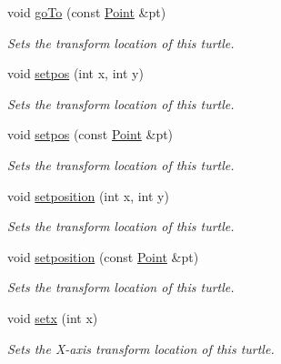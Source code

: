 \begin{DoxyCompactItemize}
\mbox{\label{classcturtle_1_1Turtle_aebaca8328fa32d5fb286ad99a57b62fc}} 
void \hyperlink{classcturtle_1_1Turtle_aebaca8328fa32d5fb286ad99a57b62fc}{go\+To} (const \hyperlink{structcturtle_1_1ivec2}{Point} \&pt)
\begin{DoxyCompactList}\small\item\em Sets the transform location of this turtle. \end{DoxyCompactList}\item 
void \hyperlink{classcturtle_1_1Turtle_ab7e2193a04b72e94069fcccd85fa40db}{setpos} (int x, int y)
\begin{DoxyCompactList}\small\item\em Sets the transform location of this turtle. \end{DoxyCompactList}\item 
void \hyperlink{classcturtle_1_1Turtle_a72b2958266efc5b3aea86a459bd04d0b}{setpos} (const \hyperlink{structcturtle_1_1ivec2}{Point} \&pt)
\begin{DoxyCompactList}\small\item\em Sets the transform location of this turtle. \end{DoxyCompactList}\item 
void \hyperlink{classcturtle_1_1Turtle_a5e9dd0e59f48e49719dd4e3bd06a82f1}{setposition} (int x, int y)
\begin{DoxyCompactList}\small\item\em Sets the transform location of this turtle. \end{DoxyCompactList}\item 
void \hyperlink{classcturtle_1_1Turtle_a7a4726103a42d73006357cc12ce79b72}{setposition} (const \hyperlink{structcturtle_1_1ivec2}{Point} \&pt)
\begin{DoxyCompactList}\small\item\em Sets the transform location of this turtle. \end{DoxyCompactList}\item 
\mbox{\label{classcturtle_1_1Turtle_a647d02a7847eef248c45b84251f6639c}} 
void \hyperlink{classcturtle_1_1Turtle_a647d02a7847eef248c45b84251f6639c}{setx} (int x)
\begin{DoxyCompactList}\small\item\em Sets the X-\/axis transform location of this turtle. \end{DoxyCompactList}\item 

\end{DoxyCompactItemize}
